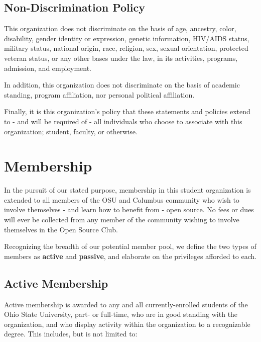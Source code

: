 \documentclass[12pt,letterpaper]{article}
\begin{document}
\subsection{Non-Discrimination Policy}

This organization does not discriminate on the basis of age, ancestry, color, disability,
gender identity or expression, genetic information, HIV/AIDS status, military status,
national origin, race, religion, sex, sexual orientation, protected veteran status, or
any other bases under the law, in its activities, programs, admission, and employment.

In addition, this organization does not discriminate on the basis of academic standing,
program affiliation, nor personal political affiliation.

Finally, it is this organization's policy that these statements and policies extend to
- and will be required of - all individuals who choose to associate with this
organization; student, faculty, or otherwise.

\section{Membership}

In the pursuit of our stated purpose, membership in this student organization is extended
to all members of the OSU and Columbus community who wish to involve themselves - and
learn how to benefit from - open source. No fees or dues will ever be collected from any
member of the community wishing to involve themselves in the Open Source Club.

Recognizing the breadth of our potential member pool, we define the two types of
members as \textbf{active} and \textbf{passive}, and elaborate on the privileges afforded
to each.

\subsection{Active Membership}

Active membership is awarded to any and all currently-enrolled students of the Ohio State
University, part- or full-time, who are in good standing with the organization, and who
display activity within the organization to a recognizable degree. This includes, but is
not limited to:
\end{document}
